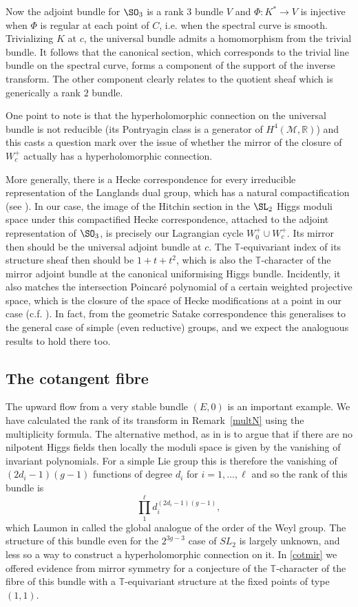 \documentclass[12pt]{article}
\numberwithin{equation}{section}
\theoremstyle{remark}
\theoremstyle{definition}
\numberwithin{theorem}{section}
\def\R{\mathbb{R}}
\newcommand{\T}{{\mathbb{T}}}
\renewcommand{\1}{\mathbbm{1}}
\begin{document}
Now the  adjoint bundle for $\SO_3$ is a rank $3$ bundle $V$ and $\Phi: K^*\rightarrow V$  is injective when $\Phi$ is regular at 
each point of $C$, i.e. when the spectral curve is smooth. Trivializing $K$
at $c$, the universal bundle admits a homomorphism from the trivial bundle. It follows that the canonical section, which corresponds to the trivial line bundle on the spectral curve,  forms a component of the 
support of the inverse transform. The other component clearly relates to the quotient sheaf which is generically a rank $2$ bundle. 

One point to note is that the hyperholomorphic connection on the universal bundle is not  reducible (its Pontryagin class is a generator of $H^4({\mathcal M},\R)$) and this casts a question mark over the
issue of whether the mirror of the closure of $W^+_c$ actually has a hyperholomorphic connection. 

More generally, there is a Hecke correspondence for every irreducible representation of the Langlands dual group, which has a natural compactification (see \cite[\S 9]{kapustin-witten}).  In our case, the image of the Hitchin section in the $\SL_2$ Higgs moduli space under this compactified Hecke  correspondence, attached to the adjoint representation of $\SO_3$, is precisely our Lagrangian cycle $W_0^+\cup W_c^+$. Its mirror then should be the universal adjoint bundle at $c$. The $\T$-equivariant index of its structure sheaf then should be $1+t+t^2$, which is also the $\T$-character of the mirror adjoint bundle at the canonical uniformising Higgs bundle. Incidently, it also matches the intersection Poincar\'e polynomial of a certain weighted projective space, which is the closure of the space of Hecke modifications at a point in our case (c.f. \cite[9.2]{kapustin-witten}). In fact, from the geometric Satake correspondence \cite{mirkovic-villonen,ginzburg} this generalises to the general case of simple (even reductive) groups, and we expect the analoguous results to hold there too. 

\subsection{The cotangent fibre} \label{cotfib}

The upward flow from a very stable bundle $(E,0)$ is an important example. 
We have calculated the rank of its transform in Remark~\ref{multN} using the multiplicity formula. The alternative method, as in \cite{beauville-etal} is to argue
that if there are no nilpotent Higgs fields then locally the moduli space is given by the vanishing of invariant polynomials. For a simple Lie group this is therefore the vanishing of  $(2d_i-1)(g-1)$ functions of degree $d_i$ for $i=1,\dots,\ell$ and so the rank of this bundle is
$$\prod_1^{\ell}d_i^{(2d_i-1)(g-1)},$$  which Laumon in \cite[Remark 6.2.3]{laumon2} called the global analogue of the order of the Weyl group. 
The structure of this bundle even for the $2^{3g-3}$ case of $SL_2$ is largely unknown, and less so a way to construct a hyperholomorphic connection on it.  In \eqref{cotmir}  we offered evidence from mirror symmetry for a conjecture of the $\T$-character of the  fibre of this bundle with a $\T$-equivariant structure at the fixed points of type $(1,1)$. 
\end{document}
